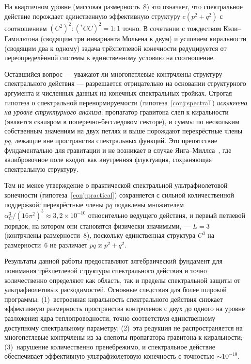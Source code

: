 \documentclass[12pt,a4paper]{article}
\theoremstyle{definition}
\theoremstyle{remark}
\begin{document}
На квартичном уровне (массовая размерность~8) это означает, что
спектральное действие порождает единственную эффективную структуру
$c(p^2 + q^2)$ с соотношением
$(C^2)^2 : ({}^{\ast}\!CC)^2 = 1{:}1$ точно.  В сочетании с тождеством
Кэли--Гамильтона (сводящим три инварианта Мольена к двум) и условием
киральности (сводящим два к одному) задача трёхпетлевой конечности
редуцируется от переопределённой системы к единственному условию на
соотношение.

Оставшийся вопрос --- уважают ли многопетлевые контрчлены структуру
спектрального действия --- разрешается отрицательно на основании
структурного аргумента и численных данных на конечных спектральных
тройках.  Строгая гипотеза о
спектральной перенормируемости (гипотеза~\ref{conj:spectral})
\emph{исключена на уровне структурного анализа}: пропагатор гравитона слеп к киральности (является
скаляром в поперечно-бесследовом секторе), и суммы по нескольким собственным значениям на
двух петлях и выше порождают перекрёстные члены $pq$, лежащие вне
пространства спектральных функций.  Это препятствие фундаментально для
гравитации и не возникает в случае Янга--Миллса~\cite{vanNuland:2021}, где
калибровочное поле входит как внутренняя флуктуация, сохраняющая
спектральную структуру.

Тем не менее утверждение о практической спектральной ультрафиолетовой
конечности (гипотеза~\ref{conj:practical}) сохраняется с сильной
количественной поддержкой: перекрёстные члены $pq$ подавлены множителем
$\alpha_C^3/(16\pi^2)^3 \approx 3{,}2 \times 10^{-10}$ относительно
ведущего действия, и первый петлевой порядок, на котором они становятся
физически значимыми, --- $L = 3$ (контрчлены размерности~8), поскольку
единственная структура $C^3$ на размерности~6 не различает $pq$ и
$p^2 + q^2$.

Результаты данной работы предоставляют алгебраический фундамент для
понимания трёхпетлевой структуры спектрального действия и точно
количественно определяют как область, так и пределы спектральной защиты
от ультрафиолетовых расходимостей.  Основные следствия для более широкой
программы: (1)~встроенная киральность спектрального действия снижает
эффективную размерность пространства контрчленов с двух до одного на уровне
разложения ядра теплопроводности, точно соответствуя единственному
доступному спектральному параметру; (2)~эта редукция не распространяется на
многопетлевые контрчлены из-за слепоты пропагатора гравитона к киральности;
(3)~нарушение количественно пренебрежимо, и спектральное действие
обеспечивает эффективную ультрафиолетовую конечность с точностью
$\sim 10^{-10}$.
\end{document}
